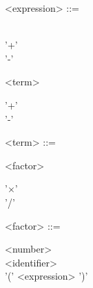 \documentclass{article}
\begin{document}
\begin{grammar}
    <expression> ::=
    \begin{syntdiag} %
        \begin{stack} \\
            '+' \\
            '-'
        \end{stack}
        \begin{rep}
            <term> \\
            \begin{stack} 
                '+' \\
                '-'
            \end{stack}
        \end{rep}
    \end{syntdiag}

    <term> ::=
    \begin{syntdiag} %
        \begin{rep}
            <factor> \\
            \begin{stack} 
                '$\times$' \\
                '/'
            \end{stack}
        \end{rep}
    \end{syntdiag}

    <factor> ::=
    \begin{syntdiag} %
        \begin{stack} 
            <number> \\
            <identifier> \\
            '(' <expression> ')'
        \end{stack}
    \end{syntdiag}
\end{grammar}
\end{document}
